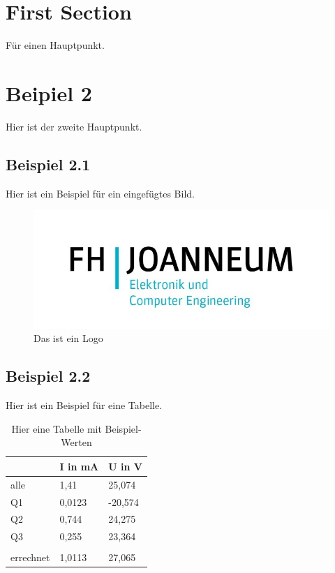 \section{First Section}     %

Für einen Hauptpunkt.

\section{Beipiel 2}

Hier ist der zweite Hauptpunkt.

\subsection{Beispiel 2.1}

Hier ist ein Beispiel für ein eingefügtes Bild.

\begin{figure}
    \centering
    \includegraphics{resources/pictures/logo.jpg}
    \caption{Das ist ein Logo}
    \label{fig:enter-label}
\end{figure}

\subsection{Beispiel 2.2}

Hier ist ein Beispiel für eine Tabelle.

\begin{table}
\caption{Hier eine Tabelle mit Beispiel-Werten}
\label{tab:Beispiel}
\begin{tabular}{l|l|l}
          & I in mA & U in V  \\ \hline
alle      & 1,41    & 25,074  \\ \hline
Q1        & 0,0123  & -20,574 \\
Q2        & 0,744   & 24,275  \\
Q3        & 0,255   & 23,364  \\
          &         &         \\
errechnet & 1,0113  & 27,065 
\end{tabular}
\end{table}

